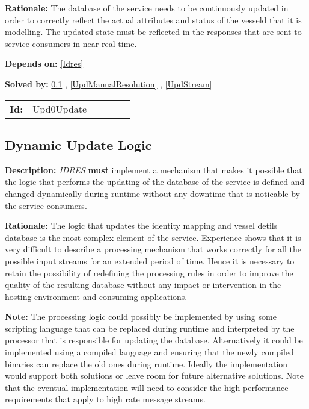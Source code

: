 \textbf{Rationale:} The database of the service needs to be continuously updated in order to correctly reflect the actual attributes and status of the  vesseld that it is modelling. The updated state must be reflected in the  responses that are sent to service consumers in near real time.

\textbf{Depends on:} \ref{Idres} 

\textbf{Solved by:} \ref{UpdLogicDynamic} , \ref{UpdManualResolution} , \ref{UpdStream} 

\par
{\small \begin{center}\begin{tabular}{rlrlrl}
\textbf{Id:} & Upd0Update  & & & \end{tabular}\end{center} }

\subsection{Dynamic Update Logic}\label{UpdLogicDynamic}
\textbf{Description:} \textsl{IDRES} \textbf{must} implement a mechanism that makes it possible that the logic that performs the updating of the database of the service is defined and changed dynamically during  runtime without any downtime that is noticable by the service consumers.

\textbf{Rationale:} The logic that updates the identity mapping and  vessel detils database is the most complex element of the service. Experience shows that it is very difficult to describe a processing  mechanism that works correctly for all the possible input streams for an extended period of time. Hence it is necessary to retain the possibility of redefining the processing rules in order to improve  the quality of the resulting database without any impact or intervention in the hosting environment and consuming applications.

\textbf{Note:} The processing logic could possibly be implemented by using some  scripting language that can be replaced during runtime and interpreted by the processor that is responsible for updating the database.  Alternatively it could be implemented using a compiled language and ensuring that the newly compiled binaries can  replace the old ones during runtime. Ideally the implementation would  support both solutions or leave room for future alternative solutions. Note that the eventual implementation will need to consider the high  performance requirements that apply to high rate message streams.

